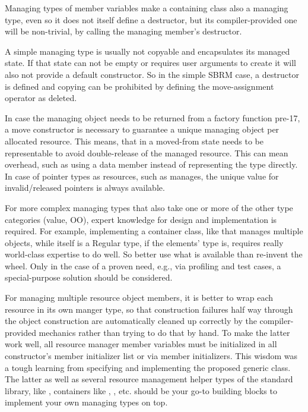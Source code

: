 \documentclass[ebook,11pt,article]{memoir}
\begin{document}
Managing types of member variables make a containing class also a managing type, even so it does not itself define a destructor, but its compiler-provided one will be non-trivial, by calling the managing member's destructor.

A simple managing type is usually not copyable and encapsulates its managed state. If that state can not be empty or requires user arguments to create it will also not provide a default constructor. So in the simple SBRM case, a destructor is defined and copying can be prohibited by defining the move-assignment operator as deleted.

In case the managing object needs to be returned from a factory function pre-\Cpp{}17, a move constructor is necessary to guarantee a unique managing object per allocated resource. This means, that in a moved-from state needs to be representable to avoid double-release of the managed resource. This can mean overhead, such as using a  data member instead of representing the  type directly. In case of pointer types as resources, such as  manages, the unique value for invalid/released pointers  is always available.

For more complex managing types that also take one or more of the other type categories (value, OO), expert knowledge for design and implementation is required. For example, implementing a container class, like  that manages multiple objects, while itself is a Regular type, if the elements' type is, requires really world-class expertise to do well. So better use what is available than re-invent the wheel. Only in the case of a proven need, e.g., via profiling and test cases, a special-purpose solution should be considered.

For managing multiple resource object members, it is better to wrap each resource in its own manger type, so that construction failures half way through the object construction are automatically cleaned up correctly by the compiler-provided mechanics rather than trying to do that by hand. To make the latter work well, all resource manager member variables must be initialized in all constructor's member initializer list or via member initializers. This wisdom was a tough learning from specifying and implementing the proposed generic  class. The latter as well as several resource management helper types of the standard library, like , containers like , , etc. should be your go-to building blocks to implement your own managing types on top.
\end{document}

